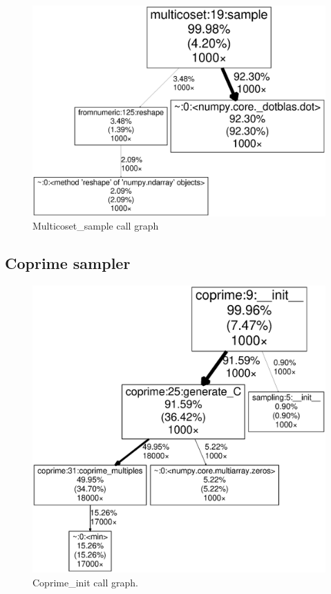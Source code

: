 \documentclass[a4paper, openany, oneside]{memoir}
\begin{document}
\begin{figure}[H]
    \centering
    \includegraphics[width=0.8\linewidth]{Multicoset_sample}
    \caption{Multicoset\_sample call graph}
    \label{fig:Multicoset_sample}
\end{figure}

\subsection{Coprime sampler}
\label{sub:coprime_sampler}

\begin{figure}[H]
    \centering
    \includegraphics[width=0.8\linewidth]{Coprime_init}
    \caption{Coprime\_init call graph.}
    \label{fig:Coprime_init}
\end{figure}
\end{document}
